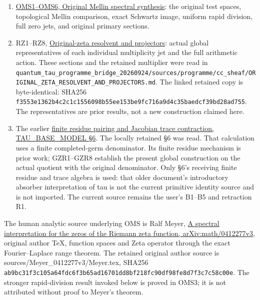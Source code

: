 \begin{enumerate}
\def\labelenumi{\arabic{enumi}.}
\tightlist
\item
  \href{ORIGINAL_MELLIN_SPECTRAL_SYNTHESIS.md}{OMS1--OMS6, Original
  Mellin spectral synthesis}: the original test spaces, topological
  Mellin comparison, exact Schwartz image, uniform rapid division, full
  zero jets, and original primary sections.
\item
  RZ1--RZ8,
  \href{https://github.com/KokunoYumeto/zeta-function-research-reader/blob/main/workbenches/splitzero-tandem/continuations/20260924-cohomology-weight-and-character-lifts/gct-weight-control/proofs/ORIGINAL_ZETA_RESOLVENT_AND_PROJECTORS.md}{Original-zeta
  resolvent and projectors}: actual global representatives of each
  individual multiplicity jet and the full arithmetic action. These
  sections and the retained multiplier were read in
  \nolinkurl{quantum_tau_programme_bridge_20260924/sources/programme/cc_sheaf/ORIGINAL_ZETA_RESOLVENT_AND_PROJECTORS.md}.
  The linked retained copy is byte-identical: SHA256
  \nolinkurl{f3553e1362b4c2c1c1556098b55ee153be9fc716a9d4c35baedcf39bd28ad755}. The
  representatives are prior results, not a new construction claimed
  here.
\item
  The earlier
  \href{https://github.com/KokunoYumeto/zeta-function-research-reader/blob/4ba9285b66af58a6d58fc502a494c1fb45ca5b79/workbenches/tau-base-cohomology/TAU_BASE_MODEL.md\#L265-L322}{finite
  residue pairing and Jacobian trace contraction, TAU\_BASE\_MODEL §6}.
  The locally retained §6 was read. That calculation uses a finite
  completed-germ denominator. Its finite residue mechanism is prior
  work; GZR1--GZR8 establish the present global construction on the
  actual quotient with the original denominator. Only §6's receiving
  finite residue and trace algebra is used: that older document's
  introductory absorber interpretation of tau is not the current
  primitive identity source and is not imported. The current source
  remains the user's B1--B5 and retraction R1.
\end{enumerate}

The human analytic source underlying OMS is Ralf Meyer,
\href{https://arxiv.org/abs/math/0412277v3}{A spectral interpretation
for the zeros of the Riemann zeta function, arXiv:math/0412277v3},
original author TeX, function spaces and Zeta operator through the exact
Fourier--Laplace range theorem. The retained original author source is
sources/Meyer\_0412277v3/Meyer.tex, SHA256
\nolinkurl{ab9bc31f3c105a64fdc6f3b65ad16701dd8bf218fc90df98fe8d7f3c7c58c00e}. The
stronger rapid-division result invoked below is proved in OMS3; it is
not attributed without proof to Meyer's theorem.

